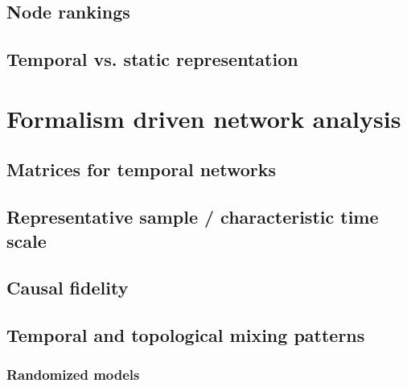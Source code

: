 \subsection{Node rankings}

\subsection{Temporal vs. static representation}

\section{Formalism driven network analysis}

\subsection{Matrices for temporal networks}

\subsection{Representative sample / characteristic time scale}

\subsection{Causal fidelity}

\subsection{Temporal and topological mixing patterns}

\subsubsection{Randomized models}







